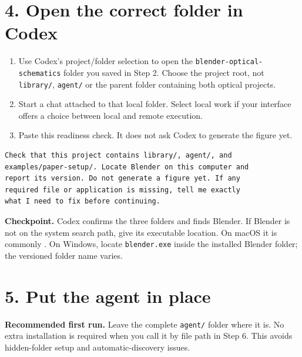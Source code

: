 \documentclass[11pt,a4paper]{article}
\begin{document}
\section*{4. Open the correct folder in Codex}
\begin{enumerate}
\item Use Codex's project/folder selection to open the \texttt{blender-optical-schematics} folder you saved in Step 2. Choose the project root, not \texttt{library/}, \texttt{agent/} or the parent folder containing both optical projects.
\item Start a chat attached to that local folder. Select local work if your interface offers a choice between local and remote execution.
\item Paste this readiness check. It does not ask Codex to generate the figure yet.
\end{enumerate}
\begin{Verbatim}[fontsize=\small]
Check that this project contains library/, agent/, and
examples/paper-setup/. Locate Blender on this computer and
report its version. Do not generate a figure yet. If any
required file or application is missing, tell me exactly
what I need to fix before continuing.
\end{Verbatim}
\textbf{Checkpoint.} Codex confirms the three folders and finds Blender. If Blender is not on the system search path, give its executable location. On macOS it is commonly . On Windows, locate \texttt{blender.exe} inside the installed Blender folder; the versioned folder name varies.
\clearpage
\section*{5. Put the agent in place}
\textbf{Recommended first run.} Leave the complete \texttt{agent/} folder where it is. No extra installation is required when you call it by file path in Step 6. This avoids hidden-folder setup and automatic-discovery issues.
\end{document}
